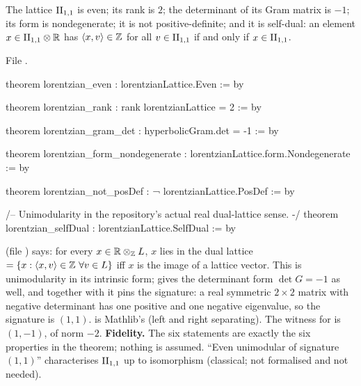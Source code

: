 \begin{theorem}\label{ch17:thm:latticeprops}
The lattice ${\mathrm{II}_{1,1}}$ is even; its rank is $2$; the determinant of its Gram matrix is $-1$; its form
is nondegenerate; it is not positive-definite; and it is self-dual: an element $x\in{\mathrm{II}_{1,1}}\otimes\mathbb R$
has $\langle x,v\rangle\in{\mathbb{Z}}$ for all $v\in{\mathrm{II}_{1,1}}$ if and only if $x\in{\mathrm{II}_{1,1}}$.
\end{theorem}

\noindent File .
\begin{leancode}
theorem lorentzian_even : lorentzianLattice.Even := by

theorem lorentzian_rank : rank lorentzianLattice = 2 := by

theorem lorentzian_gram_det : hyperbolicGram.det = -1 := by

theorem lorentzian_form_nondegenerate : lorentzianLattice.form.Nondegenerate := by

theorem lorentzian_not_posDef : ¬ lorentzianLattice.PosDef := by

/-- Unimodularity in the repository's actual real dual-lattice sense. -/
theorem lorentzian_selfDual : lorentzianLattice.SelfDual := by
\end{leancode}

\begin{dictionary}
 (file ) says: for every
$x\in\mathbb R\otimes_{\mathbb{Z}} L$, $x$ lies in the dual lattice 
$=\{x:\langle x,v\rangle\in{\mathbb{Z}}\ \forall v\in L\}$ iff $x$ is the image of a lattice vector.  This is
unimodularity in its intrinsic form;  gives the determinant form
$\det G=-1$ as well, and together with  it pins the signature: a real symmetric
$2\times2$ matrix with negative determinant has one positive and one negative eigenvalue, so the signature
is $(1,1)$.   is Mathlib's  (left and right
separating).  The witness for  is $(1,-1)$, of norm $-2$.  \textbf{Fidelity.}
The six statements are exactly the six properties in the theorem; nothing is assumed.  ``Even unimodular
of signature $(1,1)$'' characterises ${\mathrm{II}_{1,1}}$ up to isomorphism (classical; not formalised and not needed).
\end{dictionary}

